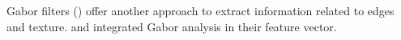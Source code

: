 \begin{enumerate}[leftmargin=*]

Gabor filters (\cite{Gabor1946,Daugman1985}) offer another approach to extract information related to edges and texture. %
%
%
%
%
\cite{Viswanath2008a,Viswanath2012} and \cite{Tiwari2012} integrated Gabor analysis in their feature vector.


\end{enumerate}
